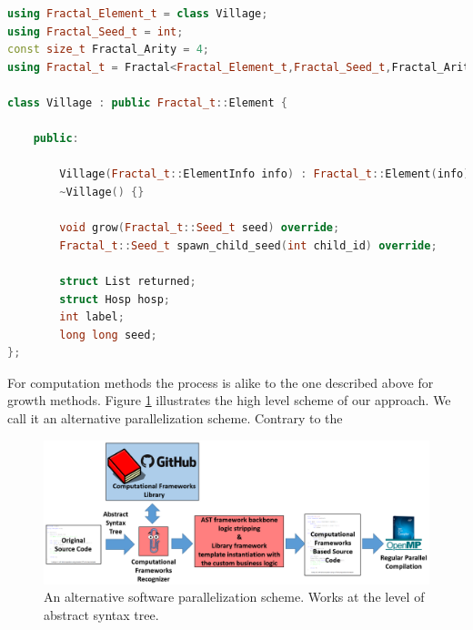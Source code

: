 \begin{minipage}[t]{\linewidth}
\begin{lstlisting}[caption={Computational framework class template skeleton},label={lst:future_work_element_frameworks},language=C++]
using Fractal_Element_t = class Village;
using Fractal_Seed_t = int;
const size_t Fractal_Arity = 4;
using Fractal_t = Fractal<Fractal_Element_t,Fractal_Seed_t,Fractal_Arity>;

class Village : public Fractal_t::Element {

    public:
        
        Village(Fractal_t::ElementInfo info) : Fractal_t::Element(info) {}
        ~Village() {}

        void grow(Fractal_t::Seed_t seed) override;
        Fractal_t::Seed_t spawn_child_seed(int child_id) override;

        struct List returned;
        struct Hosp hosp;
        int label;
        long long seed;
};
\end{lstlisting}
\end{minipage}

\quad For computation methods the process is alike to the one described above for growth methods. Figure \ref{fig:parallelization_scheme} illustrates the high level scheme of our approach. We call it an alternative parallelization scheme. Contrary to the 

\begin{figure}[ht]
\includegraphics[width=1.0\textwidth]{images/parallelization_scheme.png}
\caption{An alternative software parallelization scheme. Works at the level of abstract syntax tree.}
\label{fig:parallelization_scheme}
\end{figure}

